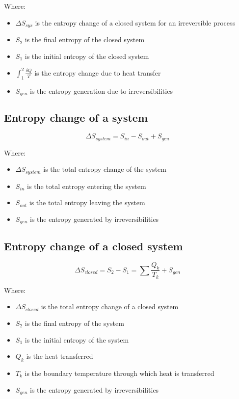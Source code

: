 \documentclass[11pt]{article}
\begin{document}
Where:
\begin{itemize}
\item \(\Delta S_{sys}\) is the entropy change of a closed system for an irreversible process
\item \(S_2\) is the final entropy of the closed system
\item \(S_1\) is the initial entropy of the closed system
\item \(\int_1^2 \frac{\delta Q}{T}\) is the entropy change due to heat transfer
\item \(S_{gen}\) is the entropy generation due to irreversibilities
\end{itemize}

\subsection{Entropy change of a system}
\label{sec:orgfd58acc}
\[\Delta S_{system} = S_{in} - S_{out} + S_{gen}\]

Where:
\begin{itemize}
\item \(\Delta S_{system}\) is the total entropy change of the system
\item \(S_{in}\) is the total entropy entering the system
\item \(S_{out}\) is the total entropy leaving the system
\item \(S_{gen}\) is the entropy generated by irreversibilities
\end{itemize}

 \newpage

\subsection{Entropy change of a closed system}
\label{sec:orge71aa32}
\[\Delta S_{closed} = S_2 - S_1 = \sum \frac{Q_k}{T_k} + S_{gen}\]

Where:
\begin{itemize}
\item \(\Delta S_{closed}\) is the total entropy change of a closed system
\item \(S_2\) is the final entropy of the system
\item \(S_1\) is the initial entropy of the system
\item \(Q_k\) is the heat transferred
\item \(T_k\) is the boundary temperature through which heat is transferred
\item \(S_{gen}\) is the entropy generated by irreversibilities
\end{itemize}
\end{document}
